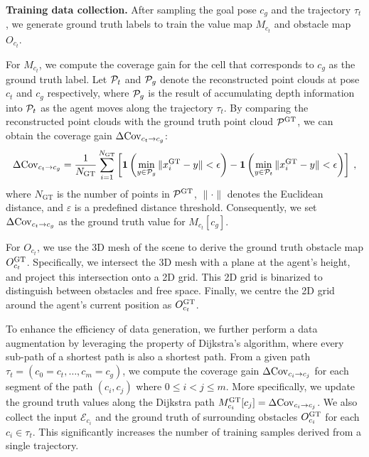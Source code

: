 \noindent \textbf{Training data collection.}
After sampling the goal pose $c_g$ and the trajectory $\tau_t$, we generate ground truth labels to train the value map $M_{c_t}$ and obstacle map $O_{c_t}$.

For $M_{c_t}$, we compute the coverage gain for the cell that corresponds to $c_g$ as the ground truth label.
Let ${\cal P}_t$ and ${\cal P}_g$ denote the reconstructed point clouds at pose $c_t$ and $c_g$ respectively, where ${\cal P}_g$ is the result of accumulating depth information into ${\cal P}_t$ as the agent moves along the trajectory $\tau_t$. By comparing the reconstructed point clouds with the ground truth point cloud ${\cal P}^{\text{GT}}$, we can obtain the coverage gain $\Delta \mathrm{Cov}_{c_t \rightarrow c_g}$:
%
\begin{equation}
\Delta \mathrm{Cov}_{{c_t}\rightarrow {c_g}} = \frac{1}{N_{\text{GT}}} \sum_{i=1}^{N_{\text{GT}}} \left[ \mathbf{1}\left( \min_{y \in \mathcal{P}_g} \Vert x_i^{\text{GT}} - y \Vert < \epsilon \right) - \mathbf{1}\left( \min_{y \in \mathcal{P}_t} \Vert x_i^{\text{GT}} - y \Vert < \epsilon \right) \right] \> ,
\label{coverage-gain}
\end{equation}
%
where $N_{\text{GT}}$ is the number of points in ${\cal P}^{\text{GT}}$, $ \| \cdot \| $ denotes the Euclidean distance, and $\varepsilon$ is a predefined distance threshold. Consequently, we set $\Delta \mathrm{Cov}_{c_t \rightarrow c_g}$ as the ground truth value for $M_{c_t}[c_g]$.


For $O_{c_t}$, we use the 3D mesh of the scene to derive the ground truth obstacle map $O_{c_t}^{\text{GT}}$.
Specifically, we intersect the 3D mesh with a plane at the agent's height, and project this intersection onto a 2D grid. This 2D grid is binarized to distinguish between obstacles and free space. Finally, we centre the 2D grid around the agent's current position as $O_{c_t}^{\text{GT}}$.

To enhance the efficiency of data generation, we further perform a data augmentation by leveraging the property of Dijkstra's algorithm, where every sub-path of a shortest path is also a shortest path. From a given path $\tau_t = (c_0 = c_t, \dots, c_m = c_g)$, we compute the coverage gain $\Delta \mathrm{Cov}_{c_i \rightarrow c_j}$ for each segment of the path $(c_i, c_j)$ where $0 \leq i < j \leq m$. More specifically, we update the ground truth values along the Dijkstra path $M^\text{GT}_{c_i}[c_j] = \Delta \mathrm{Cov}_{c_i \rightarrow c_j}$.
We also collect the input $\mathcal{E}_{c_i}$ and the ground truth of surrounding obstacles $O_{c_i}^{\text{GT}}$ for each $c_i \in \tau_t$.
This significantly increases the number of training samples derived from a single trajectory.

